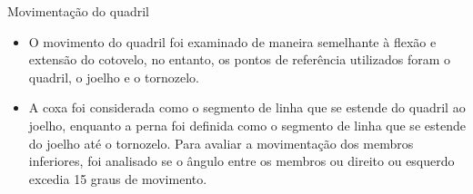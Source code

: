 \begin{frame}{Movimentação do quadril}

\begin{itemize}
        \item O movimento do quadril foi examinado de maneira semelhante à flexão e extensão
do cotovelo, no entanto, os pontos de referência utilizados foram o quadril, o joelho e o
tornozelo. 

        \item  A coxa foi considerada como o segmento de linha que se estende do quadril ao
joelho, enquanto a perna foi definida como o segmento de linha que se estende do joelho
até o tornozelo. Para avaliar a movimentação dos membros inferiores, foi analisado se o
ângulo entre os membros ou direito ou esquerdo excedia 15 graus de movimento.
    \end{itemize}
    
    
   

    
\end{frame}
